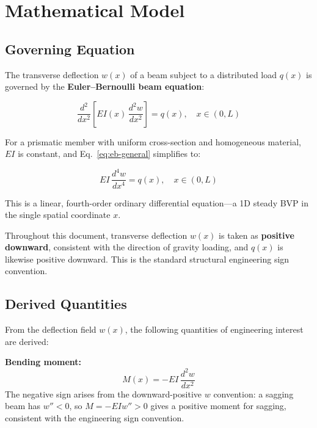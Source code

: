 
\section{Mathematical Model}

\subsection{Governing Equation}

The transverse deflection $w(x)$ of a beam subject to a distributed load $q(x)$ is governed by the \textbf{Euler--Bernoulli beam equation}:

\begin{equation}
  \frac{d^2}{dx^2}\!\left[ EI(x)\,\frac{d^2 w}{dx^2} \right] = q(x), \quad x \in (0, L)
  \label{eq:eb-general}
\end{equation}

For a prismatic member with uniform cross-section and homogeneous material, $EI$ is constant, and Eq.~\eqref{eq:eb-general} simplifies to:

\begin{equation}
  EI\,\frac{d^4 w}{dx^4} = q(x), \quad x \in (0, L)
  \label{eq:eb-prismatic}
\end{equation}

This is a linear, fourth-order ordinary differential equation---a 1D steady BVP in the single spatial coordinate $x$.

Throughout this document, transverse deflection $w(x)$ is taken as \textbf{positive downward}, consistent with the direction of gravity loading, and $q(x)$ is likewise positive downward. This is the standard structural engineering sign convention.

\subsection{Derived Quantities}

From the deflection field $w(x)$, the following quantities of engineering interest are derived:

\textbf{Bending moment:}
\begin{equation}
  M(x) = -EI\,\frac{d^2 w}{dx^2}
  \label{eq:moment}
\end{equation}
The negative sign arises from the downward-positive $w$ convention: a sagging beam has $w'' < 0$, so $M = -EI w'' > 0$ gives a positive moment for sagging, consistent with the engineering sign convention.

